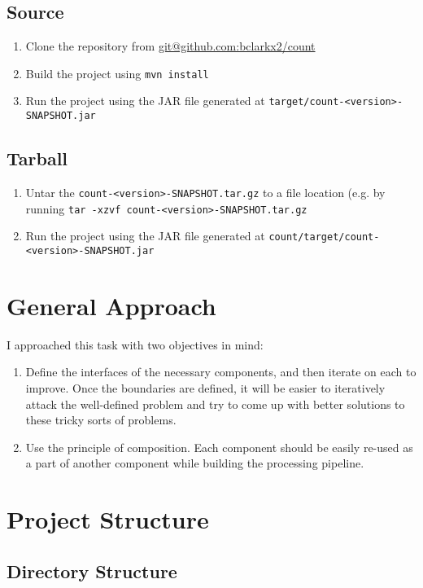 \documentclass{article}
\begin{document}
\subsection{Source}

\begin{enumerate}
 \item Clone the repository from \url{git@github.com:bclarkx2/count}
 \item Build the project using \texttt{mvn install}
 \item Run the project using the JAR file generated at \texttt{target/count-<version>-SNAPSHOT.jar}
\end{enumerate}

\subsection{Tarball}

\begin{enumerate}
 \item Untar the \texttt{count-<version>-SNAPSHOT.tar.gz} to a file location (e.g. by running \texttt{tar -xzvf count-<version>-SNAPSHOT.tar.gz}
 \item Run the project using the JAR file generated at \texttt{count/target/count-<version>-SNAPSHOT.jar}
\end{enumerate}


\section{General Approach}
I approached this task with two objectives in mind:

\begin{enumerate}
 \item Define the interfaces of the necessary components, and then iterate on each to improve. Once the boundaries are defined, it will be easier to iteratively attack the well-defined problem and try to come up with better solutions to these tricky sorts of problems.
 \item Use the principle of composition. Each component should be easily re-used as a part of another component while building the processing pipeline.
\end{enumerate}

\section{Project Structure}

\subsection{Directory Structure}
\end{document}
